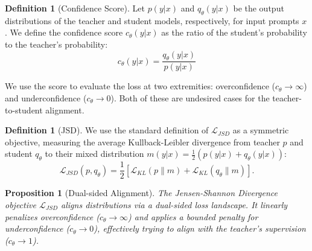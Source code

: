 \documentclass{article}
\theoremstyle{plain}
\newtheorem{proposition}[theorem]{Proposition}
\theoremstyle{definition}
\newtheorem{definition}[theorem]{Definition}
\theoremstyle{remark}
\begin{document}

\begin{definition}[Confidence Score]
Let $p(y|x)$ and $q_{\theta}(y|x)$ be the output distributions of the teacher and student models, respectively, for input prompts $x$. 
We define the confidence score $c_{\theta}(y|x)$ as the ratio of the student's probability to the teacher's probability:
\begin{equation}\label{eq:confidence}
    c_{\theta}(y|x) = \frac{q_{\theta}(y|x)}{p(y|x)}
\end{equation}
\end{definition}

We use the score to evaluate the loss at two extremities: overconfidence ($c_{\theta} \to \infty$) and underconfidence ($c_{\theta} \to 0$).
Both of these are undesired cases for the teacher-to-student alignment.

\begin{definition}[JSD]
We use the standard definition of $\mathcal{L}_{JSD}$ as a symmetric objective, measuring the average Kullback-Leibler divergence from teacher $p$ and student $q_\theta$ to their mixed distribution $m(y|x) = \frac{1}{2}(p(y|x) + q_\theta (y|x))$:
\begin{equation}\label{eq:jsd}
    \mathcal{L}_{JSD}(p, q_\theta) = \frac{1}{2} \left[ \mathcal{L}_{KL}(p \| m) + \mathcal{L}_{KL}(q_\theta \| m)\right].
\end{equation}
\end{definition}




\begin{proposition}[Dual-sided Alignment]
The Jensen-Shannon Divergence objective $\mathcal{L}_{JSD}$ aligns distributions via a dual-sided loss landscape. 
It linearly penalizes overconfidence ($c_{\theta} \to \infty$) and applies a bounded penalty for underconfidence ($c_{\theta} \to 0$), effectively trying to align with the teacher's supervision ($c_{\theta} \to 1$).
\end{proposition}
\end{document}
